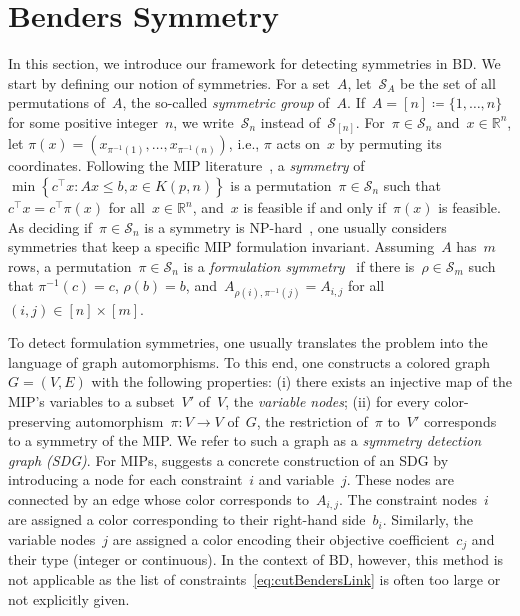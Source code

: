\documentclass[a4paper,10pt]{article}
\newcommand{\R}{\mathds{R}}
\newcommand{\sym}[1]{\mathcal{S}_{#1}}
\newcommand{\sprod}[2]{#1^\top #2}
\newcommand{\define}{\coloneqq}
\newcommand{\brackets}[1]{\left\{ #1 \right\}}
\theoremstyle{definition}
\begin{document}
\section{Benders Symmetry}\label{sec:Benders-Symmetry}
In this section, we introduce our framework for detecting symmetries in BD.
We start by defining our notion of symmetries.
For a set~$A$, let~$\sym{A}$ be the set of all permutations of~$A$, the so-called \emph{symmetric group} of~$A$.
If~${A = [n] \define \{1,\dots,n\}}$ for some positive integer~$n$, we write~$\sym{n}$ instead of~$\sym{[n]}$.
For~$\pi \in \sym{n}$ and~${x \in \R^n}$, let $\pi(x) = (x_{\pi^{-1}(1)}, \dots, x_{\pi^{-1}(n)})$, i.e., $\pi$ acts on~$x$ by permuting its coordinates.
Following the MIP literature~\cite{liberti2012reformulations,margot2009symmetry}, a \emph{symmetry} of~$\min\brackets{\sprod{c}{x} : Ax \leq b, x\in K(p, n)}$ is a permutation~$\pi \in \sym{n}$ such that~$\sprod{c}{x} = \sprod{c}{\pi(x)}$ for all~$x \in \R^n$, and~$x$ is feasible if and only if~$\pi(x)$ is feasible. 
As deciding if~$\pi \in \sym{n}$ is a symmetry is NP-hard~\cite{margot2009symmetry}, one usually considers symmetries that keep a specific MIP formulation invariant.
Assuming~$A$ has~$m$ rows, a permutation~$\pi\in\sym{n}$ is a \emph{formulation symmetry}~\cite{Salvagnin2005} if there is~$\rho\in\sym{m}$ such that $\pi^{-1}(c) = c$, $\rho(b) = b$, and~$A_{\rho(i), \pi^{-1}(j)} = A_{i, j}$ for all~$(i, j)\in[n]\times[m]$.

To detect formulation symmetries, one usually translates the problem into the language of graph automorphisms.
To this end, one constructs a colored graph~$G = (V,E)$ with the following properties:
(i) there exists an injective map of the MIP's variables to a subset~$V'$ of~$V$, the \emph{variable nodes}; (ii) for every color-preserving automorphism~$\pi\colon V \to V$ of~$G$, the restriction of~$\pi$ to~$V'$ corresponds to a symmetry of the MIP.
We refer to such a graph as a \emph{symmetry detection graph (SDG)}.
For MIPs, \cite{Salvagnin2005} suggests a concrete construction of an SDG by introducing a node for each constraint~$i$ and variable~$j$.
These nodes are connected by an edge whose color corresponds to~$A_{i,j}$.
The constraint nodes~$i$ are assigned a color corresponding to their right-hand side~$b_i$.
Similarly, the variable nodes~$j$ are assigned a color encoding their objective coefficient~$c_j$ and their type (integer or continuous).
In the context of BD, however, this method is not applicable as the list of constraints~\eqref{eq:cutBendersLink} is often too large or not explicitly given.
\end{document}

